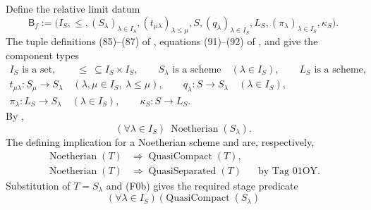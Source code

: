 \begin{definition}
  \label{def:nagata-final-descended-model}
  \checked\lean{}

  Define the relative limit datum
  \[
    \mathsf B_f
      :=\bigl(
        I_S,\leq,(S_\lambda)_{\lambda\in I_S},
        (t_{\mu\lambda})_{\lambda\leq\mu},
        S,(q_\lambda)_{\lambda\in I_S},
        L_S,(\pi_\lambda)_{\lambda\in I_S},\kappa_S
        \bigr).                                                    \tag{F0}
  \]
  The tuple definitions (85)--(87) of
  , equations (91)--(92) of
  , and
   give the component types
  \[
  \begin{gathered}
    I_S\text{ is a set},\qquad
    {\leq}\ \subseteq I_S\times I_S,\qquad
    S_\lambda\text{ is a scheme}\quad(\lambda\in I_S),\qquad
    L_S\text{ is a scheme},\\
    t_{\mu\lambda}\colon S_\mu\to S_\lambda
      \quad(\lambda,\mu\in I_S,\ \lambda\leq\mu),\qquad
    q_\lambda\colon S\to S_\lambda\quad(\lambda\in I_S),\\
    \pi_\lambda\colon L_S\to S_\lambda\quad(\lambda\in I_S),\qquad
    \kappa_S\colon S\to L_S.
  \end{gathered}                                                    \tag{F0a}
  \]
  By ,
  \[
    (\forall\lambda\in I_S)\
      \operatorname{Noetherian}(S_\lambda).                       \tag{F0b}
  \]
  The defining implication for a Noetherian scheme and
  \cite[\href{https://stacks.math.columbia.edu/tag/01OY}{Tag 01OY}]
    {stacks-project} are, respectively,
  \[
  \begin{aligned}
    \operatorname{Noetherian}(T)
      &\Longrightarrow\operatorname{QuasiCompact}(T),\\
    \operatorname{Noetherian}(T)
      &\Longrightarrow\operatorname{QuasiSeparated}(T)
        &&\text{by Tag 01OY}.
  \end{aligned}
  \]
  Substitution of $T=S_\lambda$ and (F0b) gives the required stage predicate
  \[
    (\forall\lambda\in I_S)\
      \bigl(
        \operatorname{QuasiCompact}(S_\lambda)
\]
\end{definition}
